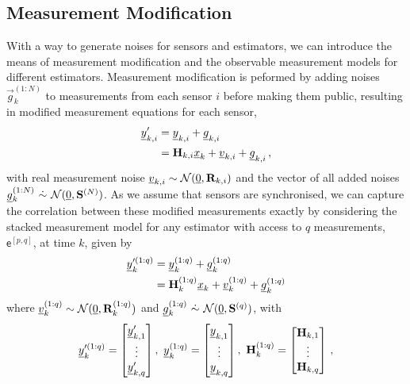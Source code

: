 \documentclass[conference]{IEEEtran}
\theoremstyle{definition}
\theoremstyle{remark}
\begin{document}
\subsection{Measurement Modification}
With a way to generate noises for sensors and estimators, we can introduce the means of measurement modification and the observable measurement models for different estimators. Measurement modification is peformed by adding noises $\vec{g}_k^{(1:N)}$ to measurements from each sensor $i$ before making them public, resulting in modified measurement equations for each sensor,
\begin{equation}\label{eqn:modified_measurement}
\begin{split}
  \vec{y}_{k,i}^\prime &= \vec{y}_{k,i} + \vec{g}_{k,i}\\
  &= \mat{H}_{k,i}\vec{x}_k + \vec{v}_{k,i} + \vec{g}_{k,i}\,,
\end{split}
\end{equation}
with real measurement noise ${\underline{v}}_{k,i}\sim\mathcal{N}({\underline{0}},{{\mathbf{R}}}_{k,i})$ and the vector of all added noises ${\underline{g}}_k^{(1:N)}\ \dot{\sim}\ \mathcal{N}({\underline{0}}, {{\mathbf{S}}}^{(N)})$. As we assume that sensors are synchronised, we can capture the correlation between these modified measurements exactly by considering the stacked measurement model for any estimator with access to $q$ measurements, $\mathsf{e}^{[p,q]}$, at time $k$, given by
\begin{equation}\label{eqn:measurement_equation}
  \begin{split}
    \vec{y}_k^{\prime(1:q)} &= \vec{y}_k^{(1:q)} + \vec{g}_k^{(1:q)}\\
    &= \mat{H}_k^{(1:q)}\vec{x}_k + \vec{v}_k^{(1:q)} + \vec{g}_k^{(1:q)}
  \end{split}
\end{equation}
where ${\underline{v}}_k^{(1:q)}\sim\mathcal{N}({\underline{0}},{{\mathbf{R}}}_k^{(1:q)})$ and $\vec{g}_k^{(1:q)}\ \dot{\sim}\ \mathcal{N}(\vec{0},\mat{S}^{(q)})$, with
\begin{equation*}
  \vec{y}_k^{\prime(1:q)}=
  \begin{bmatrix}
    \vec{y}_{k,1}^\prime\\
    \vdots\\
    \vec{y}_{k,q}^\prime
  \end{bmatrix},\ 
  \vec{y}_k^{(1:q)}=
  \begin{bmatrix}
    \vec{y}_{k,1}\\
    \vdots\\
    \vec{y}_{k,q}
  \end{bmatrix},\ 
  \mat{H}_k^{(1:q)}=
  \begin{bmatrix}
    \mat{H}_{k,1}\\
    \vdots\\
    \mat{H}_{k,q}\\
  \end{bmatrix}\,,
\end{equation*}
\end{document}
